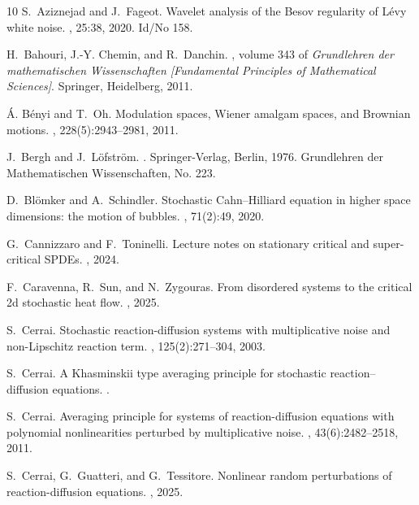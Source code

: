 \documentclass[reqno]{amsart}
\theoremstyle{plain}
\theoremstyle{remark}
\theoremstyle{plain}
\numberwithin{equation}{section}
\newcommand{\1}{\one}
\begin{document}
\begin{thebibliography}{10}
S.~Aziznejad and J.~Fageot.
\newblock Wavelet analysis of the {Besov} regularity of {L{\'e}vy} white noise.
, 25:38, 2020.
\newblock Id/No 158.

H.~Bahouri, J.-Y. Chemin, and R.~Danchin.
,
  volume 343 of {\em Grundlehren der mathematischen Wissenschaften [Fundamental
  Principles of Mathematical Sciences]}.
\newblock Springer, Heidelberg, 2011.

\'A. B\'enyi and T.~Oh.
\newblock Modulation spaces, {W}iener amalgam spaces, and {B}rownian motions.
, 228(5):2943--2981, 2011.

J.~Bergh and J.~L{\"o}fstr{\"o}m.
.
\newblock Springer-Verlag, Berlin, 1976.
\newblock Grundlehren der Mathematischen Wissenschaften, No. 223.

D.~Bl{\"o}mker and A.~Schindler.
\newblock Stochastic {C}ahn--{H}illiard equation in higher space dimensions:
  the motion of bubbles.
, 71(2):49,
  2020.

G.~Cannizzaro and F.~Toninelli.
\newblock Lecture notes on stationary critical and super-critical {SPDE}s.
, 2024.

F.~Caravenna, R.~Sun, and N.~Zygouras.
\newblock From disordered systems to the critical 2d stochastic heat flow.
, 2025.

S.~Cerrai.
\newblock Stochastic reaction-diffusion systems with multiplicative noise and
  non-{L}ipschitz reaction term.
, 125(2):271--304, 2003.

S.~Cerrai.
\newblock A {K}hasminskii type averaging principle for stochastic
  reaction--diffusion equations.
.

S.~Cerrai.
\newblock Averaging principle for systems of reaction-diffusion equations with
  polynomial nonlinearities perturbed by multiplicative noise.
, 43(6):2482--2518, 2011.

S.~Cerrai, G.~Guatteri, and G.~Tessitore.
\newblock Nonlinear random perturbations of reaction-diffusion equations.
, 2025.


\end{thebibliography}
\end{document}
